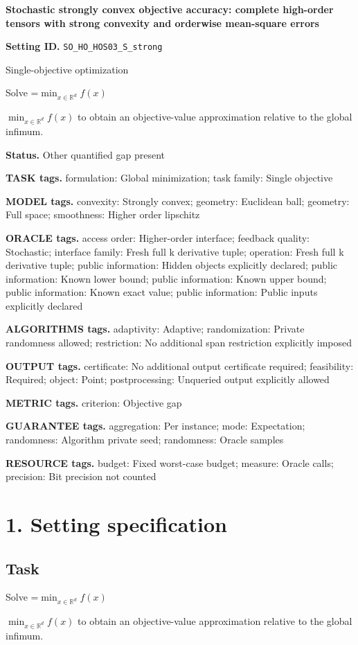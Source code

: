 \documentclass[10pt,a4paper]{article}
\newcommand{\AtlasMath}[1]{\par\begingroup\centering\setbox0=\hbox{$\displaystyle #1$}\ifdim\wd0>1.4\linewidth\typeout{ATLAS WIDE FORMULA: \the\wd0}\fi\ifdim\wd0>\linewidth\resizebox{\linewidth}{!}{\box0}\else\box0\fi\par\endgroup}
\newcommand{\AtlasInlineMath}[1]{\begingroup\setbox0=\hbox{$#1$}\ifdim\wd0>.4\linewidth\endgroup\AtlasMath{#1}\else\endgroup$#1$\fi}
\begin{document}
\raggedright

{\LARGE\bfseries\sffamily\color{AtlasNavy} Stochastic strongly convex objective accuracy: complete high-order tensors with strong convexity and orderwise mean-square errors\par}\vspace{5pt}
\textbf{Setting ID.} \texttt{SO\_\allowbreak{}HO\_\allowbreak{}HOS03\_\allowbreak{}S\_\allowbreak{}strong}

Single-objective optimization

Solve \AtlasInlineMath{\min_{x\in \mathbb{R}^d}f(x)} to obtain an objective-value approximation relative to the global infimum.

\textbf{Status.} Other quantified gap present

\textbf{TASK tags.} formulation: Global minimization; task family: Single objective

\textbf{MODEL tags.} convexity: Strongly convex; geometry: Euclidean ball; geometry: Full space; smoothness: Higher order lipschitz

\textbf{ORACLE tags.} access order: Higher-order interface; feedback quality: Stochastic; interface family: Fresh full k derivative tuple; operation: Fresh full k derivative tuple; public information: Hidden objects explicitly declared; public information: Known lower bound; public information: Known upper bound; public information: Known exact value; public information: Public inputs explicitly declared

\textbf{ALGORITHMS tags.} adaptivity: Adaptive; randomization: Private randomness allowed; restriction: No additional span restriction explicitly imposed

\textbf{OUTPUT tags.} certificate: No additional output certificate required; feasibility: Required; object: Point; postprocessing: Unqueried output explicitly allowed

\textbf{METRIC tags.} criterion: Objective gap

\textbf{GUARANTEE tags.} aggregation: Per instance; mode: Expectation; randomness: Algorithm private seed; randomness: Oracle samples

\textbf{RESOURCE tags.} budget: Fixed worst-case budget; measure: Oracle calls; precision: Bit precision not counted

\section{1. Setting specification}
\subsection{Task}
Solve \AtlasInlineMath{\min_{x\in \mathbb{R}^d}f(x)} to obtain an objective-value approximation relative to the global infimum.
\end{document}
